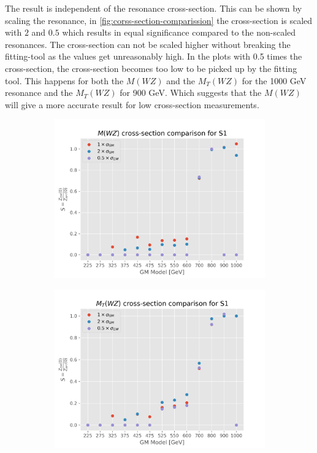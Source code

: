 \documentclass[../Bachelorarbeit.tex]{subfiles}
\begin{document}
\newpage
The result is independent of the resonance cross-section. This can be shown by scaling the resonance, in \ref{fig:corss-section-comparission} the cross-section is scaled with $2$ and $0.5$ which results in equal significance compared to the non-scaled resonances.
The cross-section can not be scaled higher without breaking the fitting-tool as the values get unreasonably high. In the plots with 0.5 times the cross-section, the cross-section becomes too low to be picked up by the fitting tool.
This happens for both the $M(WZ)$ and the $M_{T}(WZ)$ for the 1000 GeV resonance and the $M_{T}(WZ)$ for 900 GeV. Which suggests that the $M(WZ)$ will give a more accurate result for low cross-section measurements.
\begin{figure}[h]
    \centering
    \begin{subfigure}{0.45\textwidth}
        \includegraphics[width=\textwidth]{Plots/gm_relevanze/MWZ_comparision_S1.png}
        \caption{}
    \end{subfigure}
    \begin{subfigure}{0.45\textwidth}
        \includegraphics[width=\textwidth]{Plots/gm_relevanze/MTWZ_comparision_S1.png}

\end{subfigure}
\end{figure}
\end{document}
